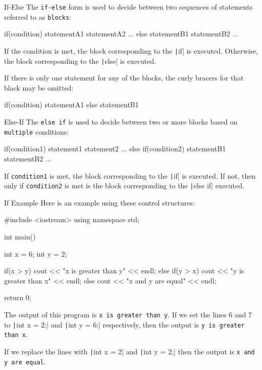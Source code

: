 \documentclass[../lecture3-flowofcontrol.tex]{subfiles}
\begin{document}
\begin{frame}[fragile]{If-Else}
    The \verb|if-else| form is used to decide between two sequences of statements referred to as \texttt{blocks}:
\begin{cppcode}[]
if(condition)
{
    statementA1
    statementA2
    ...
}
else
{
    statementB1
    statementB2
    ...
}
\end{cppcode}

    If the condition is met, the block corresponding to the \texttt|if| is executed. Otherwise, the block corresponding to the \texttt|else| is executed. \newline

    If there is only one statement for any of the blocks, the curly bracers for that black may be omitted:
\begin{cppcode}[]
if(condition)
    statementA1
else
    statementB1
\end{cppcode}
\end{frame}

\begin{frame}[fragile]{Else-If}
    The \verb|else if| is used to decide between two or more blocks based on \verb|multiple| conditions:
\begin{cppcode}[]
if(condition1)
{
    statement1
    statement2
    ...
}
else if(condition2)
{
    statementB1
    statementB2
    ...
}
\end{cppcode}

    If \texttt{condition1} is met, the block corresponding to the \texttt|if| is executed. If not, then only if \texttt{condition2} is met is the block corresponding to the \texttt|else if| executed.
\end{frame}

\begin{frame}[fragile]{If Example}
    Here is an example using these control structures:
\begin{cppcode}[]
#include <iostream>
using namespace std;

int main()
{
    int x = 6;
    int y = 2;

    if(x > y)
        cout << "x is greater than y" << endl;
    else if(y > x)
        cout << "y is greater than x" << endl;
    else
        cout << "x and y are equal" << endl;

    return 0;
}
\end{cppcode}

    The output of this program is \verb|x is greater than y|. If we set the lines 6 and 7 to \texttt|int x = 2;| and \texttt|int y = 6;| respectively, then the output is \verb|y is greater than x|. \newline

    If we replace the lines with \texttt|int x = 2| and \texttt|int y = 2;| then the output is \verb|x and y are equal|.
\end{frame}
\end{document}
